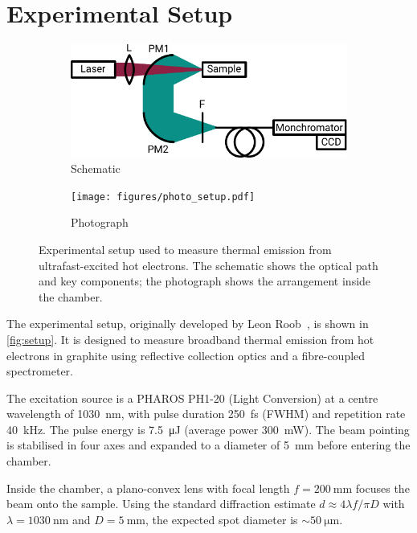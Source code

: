 \documentclass[
	parskip=half,
	a4paper,
]{scrarticle}
\begin{document}
\section{Experimental Setup}
\begin{figure}
    \centering
    \begin{subfigure}{3.5in}
        \centering
        \includegraphics{figures/setup.pdf}
        \caption{Schematic}
    \end{subfigure}\hfill
    \begin{subfigure}{2in}
        \centering
        \texttt{[image: figures/photo\_setup.pdf]}
        \caption{Photograph}
    \end{subfigure}
    \caption{Experimental setup used to measure thermal emission from ultrafast-excited hot electrons. The schematic shows the optical path and key components; the photograph shows the arrangement inside the chamber.}
    \label{fig:setup}
\end{figure}

The experimental setup, originally developed by Leon Roob~\cite{roob_thermal_2025}, is shown in \autoref{fig:setup}. It is designed to measure broadband thermal emission from hot electrons in graphite using reflective collection optics and a fibre-coupled spectrometer.

The excitation source is a PHAROS PH1-20 (Light Conversion) at a centre wavelength of \SI{1030}{\nano\metre}, with pulse duration \SI{250}{\femto\second} (FWHM) and repetition rate \SI{40}{\kilo\hertz}. The pulse energy is \SI{7.5}{\micro\joule} (average power \SI{300}{\milli\watt}). The beam pointing is stabilised in four axes and expanded to a diameter of \SI{5}{\milli\metre} before entering the chamber.

Inside the chamber, a plano-convex lens with focal length \(f=\SI{200}{\milli\metre}\) focuses the beam onto the sample. Using the standard diffraction estimate \(d \approx 4\lambda f / \pi D\) with \(\lambda=\SI{1030}{\nano\metre}\) and \(D=\SI{5}{\milli\metre}\), the expected spot diameter is \(\sim\SI{50}{\micro\metre}\).
\end{document}
